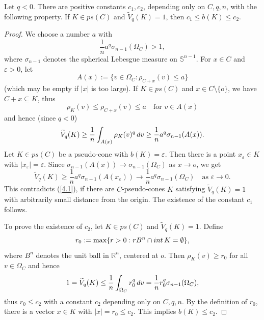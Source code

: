 \documentclass[10pt,a4paper]{amsart}
\newcommand{\D}{{\rm d}}
\newcommand{\R}{{\mathbb R}}
\newcommand{\Sn}{{\mathbb S}^{n-1}}
\begin{document}
\begin{lemma}\label{L4.1}
Let $q<0$. There are positive constants $c_1,c_2$, depending only on $C,q,n$, with the following property. If $K\in ps(C)$ and $\widetilde V_q(K)=1$, then $c_1\le b(K)\le c_2$.
\end{lemma}

\begin{proof}
We choose a number $a$ with
\begin{equation}\label{4.1}
\frac{1}{n}a^q\sigma_{n-1}(\Omega_C)>1,
\end{equation}
where $\sigma_{n-1}$ denotes the spherical Lebesgue measure on $\Sn$. For $x\in C$ and $\varepsilon>0$, let 
$$ A(x):=\{v\in\Omega_C:\rho_{C+x}(v)\le a\}$$ 
(which may be empty if $|x|$ is too large). If $K\in ps(C)$ and $x\in C\setminus\{o\}$, we have $C+x\subseteq K$, thus
$$ \rho_K(v)\le \rho_{C+x}(v)\le a\quad\mbox{for } v\in A(x)$$
and hence (since $q<0$)
$$ \widetilde V_q(K) \ge \frac{1}{n} \int_{A(x)} \rho_K(v)^q\,\D v\ge\frac{1}{n} a^q\sigma_{n-1}(A(x)).$$
Let $K\in ps(C)$ be a pseudo-cone with $b(K)=\varepsilon$. Then there is a point $x_\varepsilon\in K$ with $|x_\varepsilon|=\varepsilon$. Since $\sigma_{n-1}(A(x))\to \sigma_{n-1}(\Omega_C)$ as $x\to o$, we get
$$ \widetilde V_q(K)\ge \frac{1}{n}a^q\sigma_{n-1}(A(x_\varepsilon))\to \frac{1}{n}a^q\sigma_{n-1}(\Omega_C) \quad\mbox{as } \varepsilon \to 0.$$
This contradicts (\ref{4.1}), if there are $C$-pseudo-cones $K$ satisfying $\widetilde V_q(K)=1$ with arbitrarily small distance from the origin. The existence of the constant $c_1$ follows.

To prove the existence of $c_2$, let $K\in ps(C)$ and $\widetilde V_q(K)=1$. Define
$$ r_0:= \max\{r>0: rB^n\cap{\rm int}\,K=\emptyset\},$$
where $B^n$ denotes the unit ball in $\R^n$, centered at $o$. Then $\rho_K(v)\ge r_0$ for all $v\in\Omega_C$ and hence
$$ 1= \widetilde V_q(K) \le \frac{1}{n}\int_{\Omega_C} r_0^q\,\D v =\frac{1}{n} r_0^q\sigma_{n-1}(\Omega_C),$$
thus $r_0\le c_2$ with a constant $c_2$ depending only on $C,q,n$. By the definition of $r_0$, there is a vector $x\in K$ with $|x|=r_0\le c_2$. This implies $b(K)\le c_2$.
\end{proof}
\end{document}
